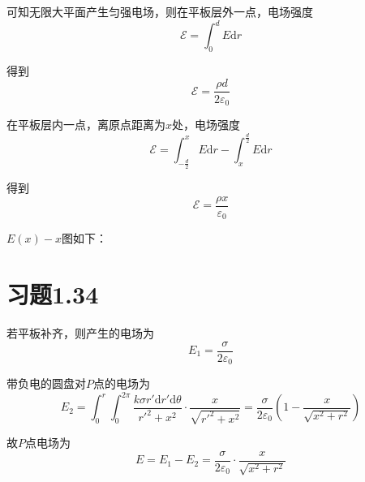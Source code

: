 \documentclass{SCIS2020cn}
\newcommand*{\num}{pi}
\begin{document}
可知无限大平面产生匀强电场，则在平板层外一点，电场强度
\begin{equation}
    \mathscr{E}=\int_0^dE\text{d}r
\end{equation}

得到
\begin{equation}
    \mathscr{E}=\frac{\rho{}d}{2\varepsilon_0}
\end{equation}

在平板层内一点，离原点距离为$x$处，电场强度
\begin{equation}
    \mathscr{E}=\int_{-\frac{d}{2}}^xE\text{d}r-\int_x^{\frac{d}{2}}E\text{d}r
\end{equation}

得到
\begin{equation}
    \mathscr{E}=\frac{\rho{}x}{\varepsilon_0}
\end{equation}

$E(x)-x$图如下：

\begin{center}
\end{center}

\section{习题1.34}
若平板补齐，则产生的电场为
\begin{equation}
    E_1=\frac{\sigma}{2\varepsilon_0}
\end{equation}

带负电的圆盘对$P$点的电场为
\begin{equation}
    E_2=\int_0^r\int_0^{2\pi}\frac{k\sigma{}r'\text{d}r'\text{d}\theta}{r'^2+x^2}·\frac{x}{\sqrt{r'^2+x^2}}=\frac{\sigma}{2\varepsilon_0}\left(1-\frac{x}{\sqrt{x^2+r^2}}\right)
\end{equation}

故$P$点电场为
\begin{equation}
    E=E_1-E_2=\frac{\sigma}{2\varepsilon_0}·\frac{x}{\sqrt{x^2+r^2}}
\end{equation}
\end{document}
